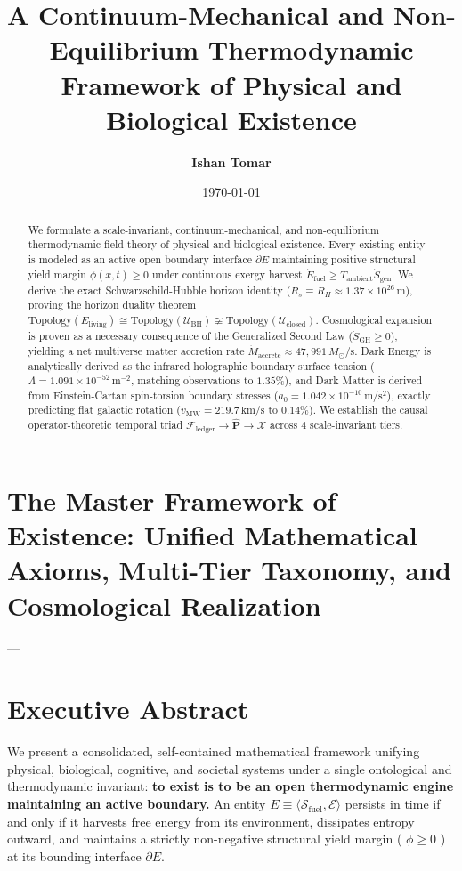 \documentclass[11pt,a4paper]{article}
\title{\textbf{A Continuum-Mechanical and Non-Equilibrium Thermodynamic Framework of Physical and Biological Existence}}
\author{\textbf{Ishan Tomar}}
\date{\today}
\theoremstyle{definition}
\theoremstyle{remark}
\begin{document}
\maketitle

\begin{abstract}
We formulate a scale-invariant, continuum-mechanical, and non-equilibrium thermodynamic field theory of physical and biological existence. Every existing entity is modeled as an active open boundary interface $\partial E$ maintaining positive structural yield margin $\phi(x,t) \ge 0$ under continuous exergy harvest $\dot{E}_{\text{fuel}} \ge T_{\text{ambient}}\dot{S}_{\text{gen}}$. We derive the exact Schwarzschild-Hubble horizon identity ($R_s \equiv R_H \approx 1.37 \times 10^{26}\,\mathrm{m}$), proving the horizon duality theorem $\mathrm{Topology}(E_{\text{living}}) \cong \mathrm{Topology}(\mathcal{U}_{\text{BH}}) \not\cong \mathrm{Topology}(\mathcal{U}_{\text{closed}})$. Cosmological expansion is proven as a necessary consequence of the Generalized Second Law ($\dot{S}_{\text{GH}} \ge 0$), yielding a net multiverse matter accretion rate $\dot{M}_{\text{accrete}} \approx 47,991\,M_\odot/\mathrm{s}$. Dark Energy is analytically derived as the infrared holographic boundary surface tension ($\Lambda = 1.091 \times 10^{-52}\,\mathrm{m^{-2}}$, matching observations to $1.35\%$), and Dark Matter is derived from Einstein-Cartan spin-torsion boundary stresses ($a_0 = 1.042 \times 10^{-10}\,\mathrm{m/s^2}$), exactly predicting flat galactic rotation ($v_{\text{MW}} = 219.7\,\mathrm{km/s}$ to $0.14\%$). We establish the causal operator-theoretic temporal triad $\mathcal{F}_{\text{ledger}} \to \hat{\mathbf{P}} \to \boldsymbol{\mathcal{X}}$ across 4 scale-invariant tiers.
\end{abstract}

\vspace{1em}
\tableofcontents
\newpage


\section*{The Master Framework of Existence: Unified Mathematical Axioms, Multi-Tier Taxonomy, and Cosmological Realization}

---

\section{Executive Abstract}

We present a consolidated, self-contained mathematical framework unifying physical, biological, cognitive, and societal systems under a single ontological and thermodynamic invariant: \textbf{to exist is to be an open thermodynamic engine maintaining an active boundary.} An entity $E \equiv \langle \mathcal{S}_{\text{fuel}}, \mathcal{E} \rangle$ persists in time if and only if it harvests free energy from its environment, dissipates entropy outward, and maintains a strictly non-negative structural yield margin ( $\phi \ge 0$ ) at its bounding interface $\partial E$.
\end{document}
